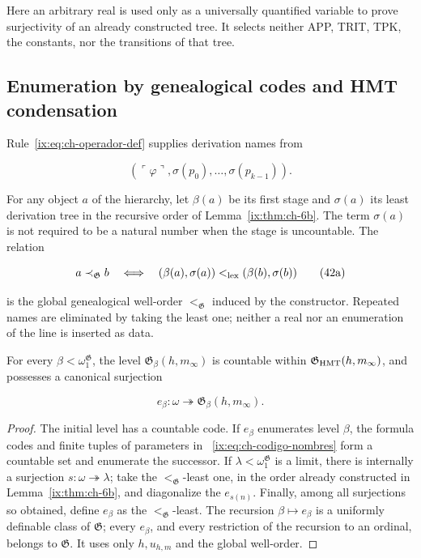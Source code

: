 Here an arbitrary real is used only as a universally quantified variable to
prove surjectivity of an already constructed tree. It selects neither APP,
TRIT, TPK, the constants, nor the transitions of that tree.

\subsection{Enumeration by genealogical codes and HMT condensation}

Rule~\eqref{ix:eq:ch-operador-def} supplies derivation names from

\[
 (\ulcorner\varphi\urcorner,
  \sigma(p_0),\ldots,\sigma(p_{k-1})).
\tag{42}\label{ix:eq:ch-codigo-nombres}
\]

For any object \(a\) of the hierarchy, let \(\beta(a)\) be its first stage and
\(\sigma(a)\) its least derivation tree in the recursive order of
Lemma~\ref{ix:thm:ch-6b}. The term \(\sigma(a)\) is not required to be a natural
number when the stage is uncountable. The relation

\[
 a\prec_{\mathfrak G}b
 \quad\Longleftrightarrow\quad
 (\beta(a),\sigma(a))<_{\rm lex}
 (\beta(b),\sigma(b))
\tag{42a}\label{ix:eq:ch-orden-genealogico}
\]

is the global genealogical well-order \(<_{\mathfrak G}\) induced by the
constructor. Repeated names are eliminated by taking the least one; neither a
real nor an enumeration of the line is inserted as data.

\begin{lemma}
\label{ix:thm:ch-7}
For every \(\beta<\omega_1^{\mathfrak G}\), the level
\(\mathfrak G_\beta(h,m_\infty)\) is countable within
\(\mathfrak G_{\rm HMT}(h,m_\infty)\), and possesses a canonical surjection

\[
 e_\beta:\omega\twoheadrightarrow
 \mathfrak G_\beta(h,m_\infty).
\tag{43}\label{ix:eq:ch-enumeracion-niveles}
\]

\end{lemma}
\begin{proof}
The initial level has a countable code. If \(e_\beta\) enumerates level
\(\beta\), the formula codes and finite tuples of parameters in
~\eqref{ix:eq:ch-codigo-nombres} form a countable set and enumerate the successor.
If \(\lambda<\omega_1^{\mathfrak G}\) is a limit, there is internally a
surjection \(s:\omega\twoheadrightarrow\lambda\); take the
\(<_{\mathfrak G}\)-least one, in the order already constructed in
Lemma~\ref{ix:thm:ch-6b}, and diagonalize the \(e_{s(n)}\). Finally, among all
surjections so obtained, define \(e_\beta\) as the
\(<_{\mathfrak G}\)-least. The recursion \(\beta\mapsto e_\beta\) is a
uniformly definable class of \(\mathfrak G\); every \(e_\beta\), and every
restriction of the recursion to an ordinal, belongs to \(\mathfrak G\). It
uses only \(h,u_{h,m}\) and the global well-order.
\end{proof}

